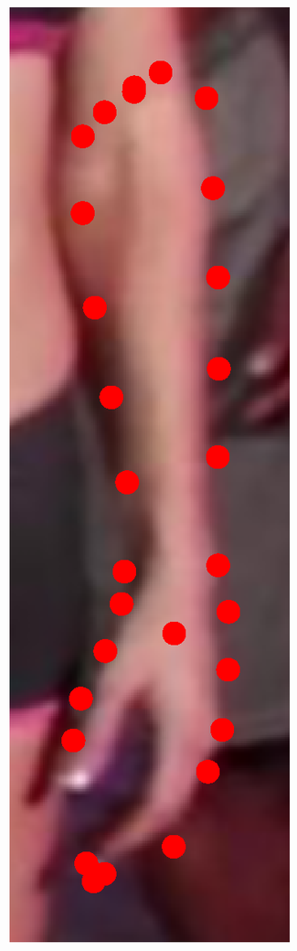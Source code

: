 \begin{figure}[!t]
    \includegraphics[height=\ofh]{resources/Annotation_Correction/Fittings/35.eps}
    \hfill

\end{figure}
